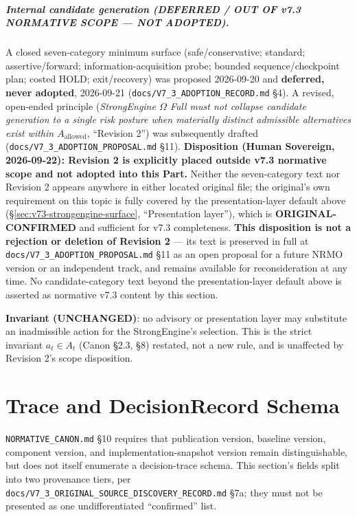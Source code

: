 \paragraph{Internal candidate generation (\textbf{DEFERRED / OUT OF
v7.3 NORMATIVE SCOPE --- NOT ADOPTED}).} A closed seven-category
minimum surface (safe/conservative; standard; assertive/forward;
information-acquisition probe; bounded sequence/checkpoint plan;
costed HOLD; exit/recovery) was proposed 2026-09-20 and \textbf{deferred,
never adopted}, 2026-09-21 (\texttt{docs/V7\_3\_ADOPTION\_RECORD.md}
\S4). A revised, open-ended principle (\emph{StrongEngine $\Omega$ Full
must not collapse candidate generation to a single risk posture when
materially distinct admissible alternatives exist within
$A_{\mathrm{allowed}}$}, ``Revision 2'') was subsequently drafted
(\texttt{docs/V7\_3\_ADOPTION\_PROPOSAL.md} \S11). \textbf{Disposition
(Human Sovereign, 2026-09-22): Revision 2 is explicitly placed outside
v7.3 normative scope and not adopted into this Part.} Neither the
seven-category text nor Revision 2 appears anywhere in either located
original file; the original's own requirement on this topic is fully
covered by the presentation-layer default above
(\S\ref{sec:v73-strongengine-surface}, ``Presentation layer''), which
is \textbf{ORIGINAL-CONFIRMED} and sufficient for v7.3 completeness.
\textbf{This disposition is not a rejection or deletion of Revision
2} --- its text is preserved in full at
\texttt{docs/V7\_3\_ADOPTION\_PROPOSAL.md} \S11 as an open proposal for
a future NRMO version or an independent track, and remains available
for reconsideration at any time. No candidate-category text beyond the
presentation-layer default above is asserted as normative v7.3 content
by this section.

\noindent
\textbf{Invariant (UNCHANGED)}: no advisory or presentation layer may
substitute an inadmissible action for the StrongEngine's selection.
This is the strict invariant $a_t \in A_t$ (Canon \S2.3, \S8) restated,
not a new rule, and is unaffected by Revision 2's scope disposition.

\chapter{Trace and DecisionRecord Schema}
\label{ch:v73-trace-schema}

\texttt{NORMATIVE\_CANON.md} \S10 requires that publication version,
baseline version, component version, and implementation-snapshot
version remain distinguishable, but does not itself enumerate a
decision-trace schema. This section's fields split into two
provenance tiers, per
\texttt{docs/V7\_3\_ORIGINAL\_SOURCE\_DISCOVERY\_RECORD.md} \S7a; they
must not be presented as one undifferentiated ``confirmed'' list.

